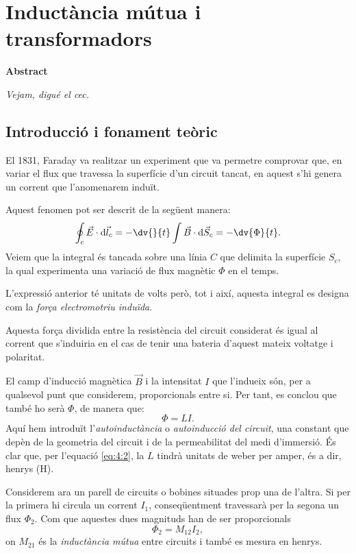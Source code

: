 \documentclass[a4paper,10.5pt]{report}
\newenvironment{chapterabstract}{
	\begin{center}
		\bfseries Abstract
	\end{center}
	\quotation
}{\endquotation}
\begin{document}
\chapter{Inductància mútua i transformadors}

\begin{chapterabstract}
	\textit{Vejam, digué el cec.}
\end{chapterabstract}

\section{Introducció i fonament teòric}
El 1831, Faraday va realitzar un experiment que va permetre comprovar que, en variar el flux que travessa la superfície d'un circuit tancat, en aquest s'hi genera un corrent que l'anomenarem induït.

Aquest fenomen pot ser descrit de la següent manera:
\begin{equation}
	\oint_c \Vec{E}\cdot \mathrm{d}\Vec{l}_c = -\dv{}{t} \int \Vec{B}\cdot \mathrm{d} \Vec{S}_c = - \dv{\Phi}{t} \label{eq:4:1}.
\end{equation}
Veiem que la integral és tancada sobre una línia $C$ que delimita la superfície $S_c$, la qual experimenta una variació de flux magnètic $\Phi$ en el temps.

L'expressió anterior té unitats de volts però, tot i així, aquesta integral es designa com la \textit{força electromotriu induïda}.

Aquesta força dividida entre la resistència del circuit considerat és igual al corrent que s'induiria en el cas de tenir una bateria d'aquest mateix voltatge i polaritat.

El camp d'inducció magnètica $\Vec{B}$ i la intensitat $I$ que l'indueix són, per a qualsevol punt que considerem, proporcionals entre si. Per tant, es conclou que també ho serà $\Phi$, de manera que:
\begin{equation}
	\Phi=LI \label{eq:4:2}.
\end{equation}
Aquí hem introduït l'\textit{autoinductància} o \textit{autoinducció del circuit}, una constant que depèn de la geometria del circuit i de la permeabilitat del medi d'immersió. És clar que, per l'equació \eqref{eq:4:2}, la $L$ tindrà unitats de weber per amper, és a dir, henrys (H).

Considerem ara un parell de circuits o bobines situades prop una de l'altra. Si per la primera hi circula un corrent $I_1$, conseqüentment travessarà per la segona un flux $\Phi_2$. Com que aquestes dues magnituds han de ser proporcionals
\begin{equation}
	\Phi_2=M_{12}I_2 \label{eq:4:3},
\end{equation}
on $M_{21}$ és la \textit{inductància mútua} entre circuits i també es mesura en henrys.
\end{document}
